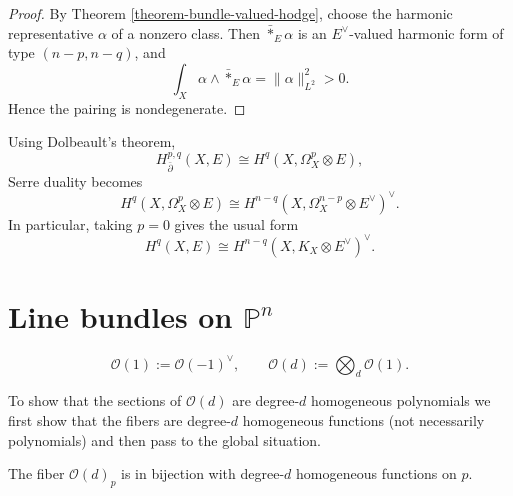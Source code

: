 \begin{proof}
By Theorem
\ref{theorem-bundle-valued-hodge}, choose
the harmonic representative $\alpha$ of a
nonzero class. Then
$\bar *_{E}\alpha$ is an
$E^\vee$-valued harmonic form of type
$(n-p,n-q)$, and
$$
\int_X\alpha\wedge\bar *_{E}\alpha
=
\|\alpha\|_{L^2}^2>0.
$$
Hence the pairing is nondegenerate.
\end{proof}

\noindent
Using Dolbeault's theorem,
$$
H^{p,q}_{\bar\partial}(X,E)
\cong
H^q(X,\Omega_X^p\otimes E),
$$
Serre duality becomes
$$
H^q(X,\Omega_X^p\otimes E)
\cong
H^{n-q}(X,\Omega_X^{n-p}\otimes
E^\vee)^\vee.
$$
In particular, taking $p=0$ gives the usual
form
$$
H^q(X,E)
\cong
H^{n-q}(X,K_X\otimes E^\vee)^\vee.
$$

\section{Line bundles on $\mathbb{P}^n$}
\label{section-line-bundles-on-pn}

\begin{definition}
\label{definition-line-bundles-in-pn}
$$
\mathcal{O}(1):=\mathcal{O}(-1)^\vee,\qquad
\mathcal{O}(d):=\bigotimes_d \mathcal{O}(1).
$$
\end{definition}

\noindent
To show that the sections of $\mathcal{O}(d)$
are degree-$d$ homogeneous polynomials we
first
show that the fibers are degree-$d$
homogeneous functions
(not necessarily polynomials)
and then pass to the global situation.

\begin{lemma}
\label{lemma-fiber-od-homog-degre-d-funct}
The fiber $\mathcal{O}(d)_p$ is in bijection
with
degree-$d$ homogeneous functions on $p$.
\end{lemma}

